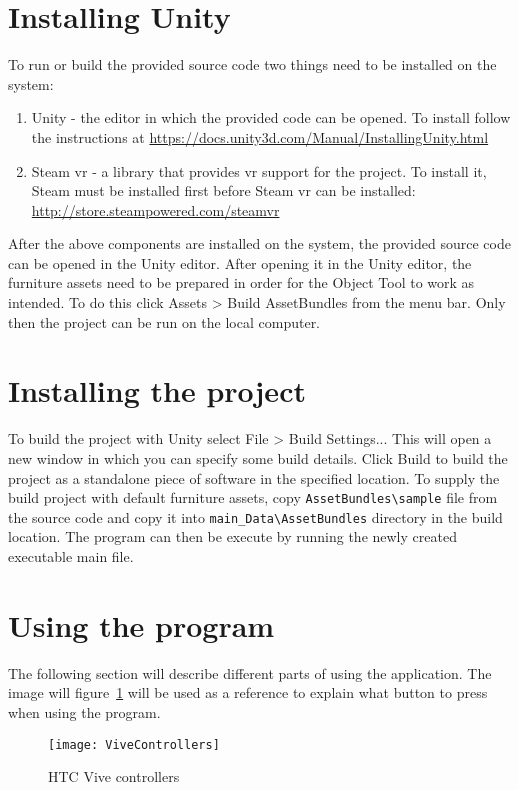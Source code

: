 \section*{Installing Unity}
To run or build the provided source code two things need to be installed on the system:

\begin{enumerate}
    \item Unity - the editor in which the provided code can be opened. To install follow the instructions at \url{https://docs.unity3d.com/Manual/InstallingUnity.html} %
    \item Steam \acrshort{vr} - a library that provides \acrshort{vr} support for the project. To install it, Steam must be installed first before Steam \acrshort{vr} can be installed: \url{http://store.steampowered.com/steamvr}
\end{enumerate}

After the above components are installed on the system, the provided source code can be opened in the Unity editor. After opening it in the Unity editor, the furniture assets need to be prepared in order for the Object Tool to work as intended. To do this click Assets > Build AssetBundles from the menu bar. Only then the project can be run on the local computer.

\section*{Installing the project}
To build the project with Unity select File > Build Settings... This will open a new window in which you can specify some build details. Click Build to build the project as a standalone piece of software in the specified location. To supply the build project with default furniture assets, copy \verb|AssetBundles\sample| file from the source code and copy it into \verb|main_Data\AssetBundles| directory in the build location. The program can then be execute by running the newly created executable main file.

\section*{Using the program}
The following section will describe different parts of using the application. The image will figure~\ref{fig:vive_controllers} will be used as a reference to explain what button to press when using the program.

\begin{figure}[!ht]
 \texttt{[image: ViveControllers]}
 \caption{HTC Vive controllers}
 \label{fig:vive_controllers}
\end{figure}

